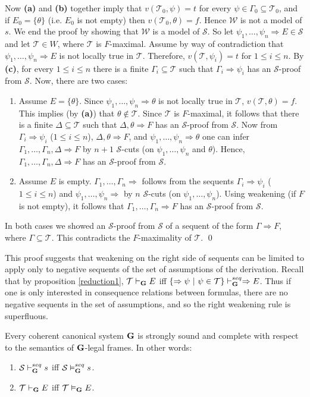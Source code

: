 \documentclass{LMCS}
\theoremstyle{remark}
\newcommand{\Ss}{\mathcal{S}}
\newcommand{\T}{\mathcal{T}}
\newcommand{\G}{{\bf G}}
\newcommand{\W}{\mathcal{W}}
\newcommand{\psitil}{\psi_1 \til \psi_n}
\newcommand{\be}{\begin{enumerate}[(1)]}
\newcommand{\ee}{\end{enumerate}}
\newcommand{\Ra}{\Rightarrow}
\newcommand{\g}{\Gamma}
\newcommand{\de}{\Delta}
\newcommand{\vd}{\vdash}
\newcommand{\vD}{\vDash}
\newcommand{\st}{{\ |\ }}   \newcommand{\til}{,\dots,}
\newcommand{\suq}{\subseteq}
\begin{document}
\begin{enumerate}[(a)]
\begin{enumerate}[\bf(a):]
Now {\bf (a)} and {\bf (b)} together imply  that
${v(\T_0,\psi)=t}$ for every ${\psi\in\g_0\suq\T_0}$, and
if $E_0={\{\theta\}}$ (i.e. $E_0$ is not empty) then ${v(\T_0,\theta)=f}$. 
Hence ${\W}$ is not a model of ${s}$.
We end the proof by showing that ${\W}$ is a model of $\Ss$. 
So let ${\psitil\Ra E\in \Ss}$ and let ${\T\in W}$,
where $\T$ is $F$-maximal.
Assume by way of contradiction that
${\psitil\Ra E}$ is not locally true in $\T$.
Therefore, ${v(\T,\psi_i)=t}$ for $1\leq i\leq n$. 
By {\bf (c)}, for every $1\leq i\leq n$ 
there is a finite ${\g_i\suq\T}$ such that ${\g_i\Ra\psi_i}$
has an $\Ss$-proof from $\Ss$. 
Now, there are two cases:
\be
\item Assume ${E=\{\theta\}}$. Since ${\psitil\Ra \theta}$ is not locally true in $\T$, ${v(\T,\theta)=f}$.
This implies (by {\bf (a)}) that ${\theta \notin \T}$. 
Since $\T$ is $F$-maximal,
it follows that there is a finite ${\de\suq\T}$ such that
${\de,\theta\Ra F}$ has an $\Ss$-proof from $\Ss$.
Now from ${\g_i\Ra\psi_i}$ ($1\leq i\leq n$), ${\de,\theta\Ra F}$,
and ${\psitil\Ra\theta}$ one can infer
$\g_1\til\g_n,\de\Ra F$ by $n+1$ $\Ss$-cuts 
(on $\psitil$ and $\theta$). 
Hence, 
$\g_1\til\g_n,\de\Ra F$ has an $\Ss$-proof from $\Ss$.
\item Assume $E$ is empty.
$\g_1\til\g_n\Ra $ follows from 
the sequents ${\g_i\Ra\psi_i}$ ($1\leq i\leq n$) and ${\psitil\Ra }$ 
by $n$ $\Ss$-cuts (on $\psitil$). 
Using weakening (if $F$ is not empty), it follows that 
$\g_1\til\g_n\Ra F$ has an $\Ss$-proof from $\Ss$.
\ee 
In both cases we showed an $\Ss$-proof from $\Ss$ of a sequent of 
the form $\g \Ra F$, where $\g\suq\T$. 
This contradicts the $F$-maximality of $\T$.
\qed

\begin{rem}
This proof suggests that weakening on the right side of sequents can be limited
to apply only to negative sequents of the set of assumptions of the derivation.
Recall that by proposition \ref{reduction1}, 
$\T\vd_{\G} E$ iff $\{\Ra\psi\st\psi\in\T\}\vd_{\G}^{seq}\Ra E$.
Thus if one is only interested in consequence relations
 between formulas, there are no negative 
sequents in the set of assumptions, and so the right weakening rule is superfluous.
\end{rem}

\sloppy
\begin{thm}
\label{completeness}
Every coherent canonical system ${\G}$
is strongly sound and complete with respect to the semantics
of ${\G}$-legal frames. In other words:
\be
\item $\Ss\vd_{\G}^{seq}s$ iff $\Ss\vD_{\G}^{seq}s$.
\item $\T\vd_{\G} E$ iff $\T\vD_{\G} E$.
\ee
\end{thm}


\end{enumerate}
\end{enumerate}
\end{document}

